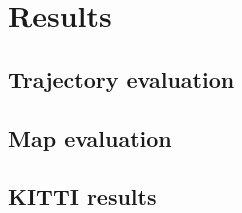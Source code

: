 \chapter{Results}
\label{ch:results}


\section{Trajectory evaluation}

\section{Map evaluation}

\section{KITTI results}

